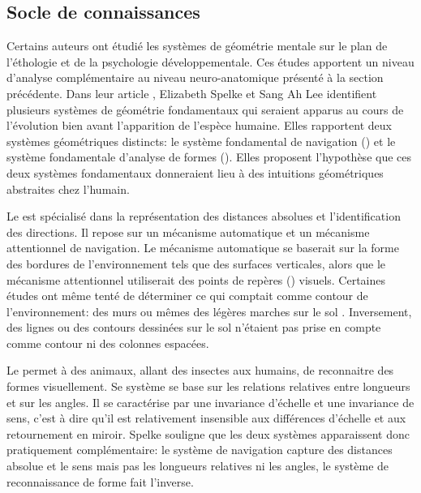 \subsection{Socle de connaissances}
\label{sec:core}

\noindent
Certains auteurs ont étudié les systèmes de géométrie mentale sur le plan de l'éthologie et de la psychologie développementale. 
Ces études apportent un niveau d'analyse complémentaire au niveau neuro-anatomique présenté à la section précédente. 
Dans leur article \og {} \fg, Elizabeth Spelke et Sang Ah Lee identifient plusieurs systèmes de géométrie fondamentaux qui seraient apparus au cours de l'évolution bien avant l'apparition de l'espèce humaine. 
Elles rapportent deux systèmes géométriques distincts: le système fondamental de navigation () et le système fondamentale d'analyse de formes ().  
Elles proposent l'hypothèse que ces deux systèmes fondamentaux donneraient lieu à des intuitions géométriques abstraites chez l'humain. 

Le  est spécialisé dans la représentation des distances absolues et l'identification des directions.
Il repose sur un mécanisme automatique et un mécanisme attentionnel de navigation. 
Le mécanisme automatique se baserait sur la forme des bordures de l'environnement tels que des surfaces verticales, alors que le mécanisme attentionnel utiliserait des points de repères () visuels. 
Certaines études ont même tenté de déterminer ce qui comptait comme contour de l'environnement: des murs ou mêmes des légères marches sur le sol \cite{cheng_purely_1986}. 
Inversement, des lignes ou des contours dessinées sur le sol n'étaient pas prise en compte comme contour ni des colonnes espacées.  
 

Le  permet à des animaux, allant des insectes aux humains, de  reconnaitre des formes visuellement. 
Se système se base sur les relations relatives entre longueurs et sur les angles. Il se caractérise par une invariance d'échelle et une invariance de sens, c'est à dire qu'il est relativement insensible aux différences d'échelle et aux retournement en miroir.
Spelke souligne que les deux systèmes apparaissent donc pratiquement complémentaire: le système de navigation capture des distances absolue et le sens mais pas les longueurs relatives ni les angles, le système de reconnaissance de forme fait l'inverse. 

